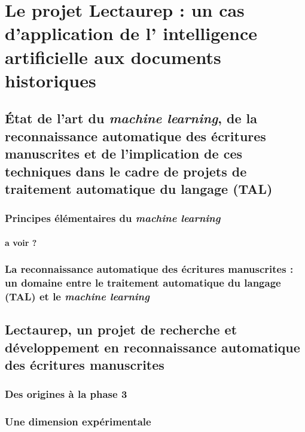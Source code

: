 \part{Le projet Lectaurep : un cas d'application de l' \og intelligence artificielle\fg{}  aux documents historiques}
\chapter{État de l'art du \textit{machine learning}, de la reconnaissance automatique des écritures manuscrites et de l'implication de ces techniques dans le cadre de projets de traitement automatique du langage (TAL)}
\section{Principes élémentaires du \textit{machine learning}}
\subsection{a voir ?}
\section{La reconnaissance automatique des écritures manuscrites : un domaine entre le traitement automatique du langage (TAL) et le \textit{machine learning}}
\chapter{Lectaurep, un projet de recherche et développement en reconnaissance automatique des écritures manuscrites}
\section{Des origines à la phase 3}
\section{Une dimension expérimentale}